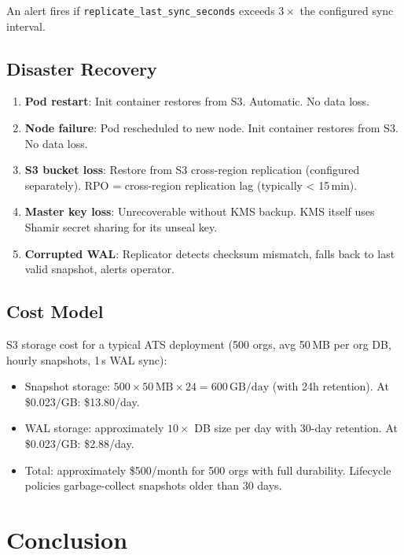\documentclass[11pt,a4paper]{article}
\begin{document}
An alert fires if \texttt{replicate\_last\_sync\_seconds} exceeds
$3\times$ the configured sync interval.

\subsection{Disaster Recovery}

\begin{enumerate}[nosep]
  \item \textbf{Pod restart}: Init container restores from S3.
    Automatic. No data loss.
  \item \textbf{Node failure}: Pod rescheduled to new node. Init
    container restores from S3. No data loss.
  \item \textbf{S3 bucket loss}: Restore from S3 cross-region
    replication (configured separately). RPO = cross-region
    replication lag (typically < 15\,min).
  \item \textbf{Master key loss}: Unrecoverable without KMS backup.
    KMS itself uses Shamir secret sharing for its unseal key.
  \item \textbf{Corrupted WAL}: Replicator detects checksum mismatch,
    falls back to last valid snapshot, alerts operator.
\end{enumerate}

\subsection{Cost Model}

S3 storage cost for a typical ATS deployment (500 orgs, avg 50\,MB
per org DB, hourly snapshots, 1\,s WAL sync):

\begin{itemize}[nosep]
  \item Snapshot storage: $500 \times 50\,\text{MB} \times 24 = 600\,\text{GB/day}$
    (with 24h retention). At \$0.023/GB: \$13.80/day.
  \item WAL storage: approximately $10\times$ DB size per day with
    30-day retention. At \$0.023/GB: \$2.88/day.
  \item Total: approximately \$500/month for 500 orgs with full
    durability. Lifecycle policies garbage-collect snapshots older
    than 30 days.
\end{itemize}

\section{Conclusion}\label{sec:conclusion}
\end{document}
